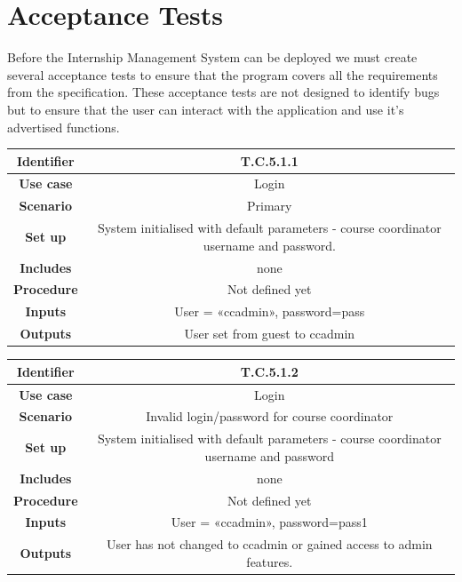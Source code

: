 \documentclass{l3deliverable}
\begin{document}




\section{Acceptance Tests}

Before the Internship Management System can be deployed we must create
several acceptance tests to ensure that the program covers all the
requirements from the specification. These acceptance tests are not
designed to identify bugs but to ensure that the user can interact
with the application and use it's advertised functions.\\

\begin{tabular}{|c|c|}
\hline \textbf{Identifier} & T.C.5.1.1\\
\hline \textbf{Use case} & Login \\
\hline \textbf{Scenario} & Primary \\
\hline \textbf{Set up} & System initialised with default parameters - course coordinator username and password.\\
\hline \textbf{Includes} & none\\
\hline \textbf{Procedure} & Not defined yet\\
\hline \textbf{Inputs} & User = «ccadmin», password=pass\\
\hline \textbf{Outputs} & User set from guest to ccadmin \\
\hline
\end{tabular}

\begin{tabular}{|c|c|}
\hline \textbf{Identifier} & T.C.5.1.2 \\
\hline \textbf{Use case} & Login\\
\hline \textbf{Scenario} & Invalid login/password for course coordinator\\
\hline \textbf{Set up} & System initialised with default parameters - course coordinator username and password\\
\hline \textbf{Includes} & none\\
\hline \textbf{Procedure} & Not defined yet\\
\hline \textbf{Inputs} & User = «ccadmin», password=pass1\\
\hline \textbf{Outputs} & User has not changed to ccadmin or gained access to admin features.\\
\hline
\end{tabular}
\end{document}
